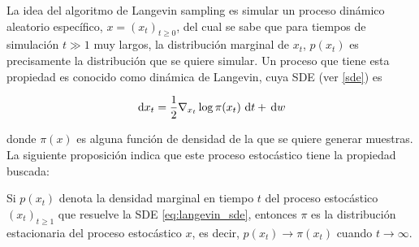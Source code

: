 La idea del algoritmo de Langevin sampling es simular un proceso dinámico aleatorio específico, $x=(x_t)_{t\geq 0}$,  del cual se sabe que para tiempos de simulación $t\gg 1$ muy largos, la distribución marginal de $x_t$, $p(x_t)$ es precisamente la distribución que se quiere simular. Un proceso que tiene esta propiedad es conocido como dinámica de Langevin, cuya SDE (ver \autoref{sde}) es

\begin{equation}
    \label{eq:langevin_sde}
    \,\operatorname{d}\! x_t = \frac{1}{2}\nabla_{x_t} \log \pi(x_t) \,\operatorname{d}\! t + \,\operatorname{d}\! w
\end{equation}

donde $\pi(x)$ es alguna función de densidad de la que se quiere generar muestras. La siguiente proposición indica que este proceso estocástico tiene la propiedad buscada:

\begin{prop}
    Si $p(x_t)$ denota la densidad marginal en tiempo $t$ del proceso estocástico $(x_t)_{t\geq 1}$ que resuelve la SDE \eqref{eq:langevin_sde}, entonces $\pi$ es la distribución estacionaria del proceso estocástico $x$, es decir, $p(x_t)\to \pi(x_t)$ cuando $t\to\infty$.
\end{prop}

